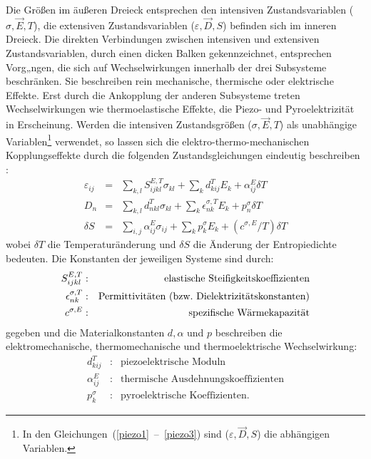 Die Größen im äußeren Dreieck entsprechen den intensiven Zustandsvariablen
($\sigma, \vec{E}, T$), die extensiven Zustandsvariablen
($\varepsilon, \vec{D}, S$) befinden sich
im inneren Dreieck. Die direkten Verbindungen zwischen
intensiven und extensiven Zustandsvariablen, durch einen dicken Balken
gekennzeichnet, entsprechen Vorg„ngen, die sich auf Wechselwirkungen
innerhalb der drei Subsysteme beschränken.  Sie beschreiben rein
mechanische, thermische
oder elektrische Effekte.  Erst durch die Ankopplung der anderen
Subsysteme treten Wechselwirkungen wie thermoelastische Effekte,
die Piezo- und Pyroelektrizität in Erscheinung.
Werden die intensiven Zustandsgrößen ($\sigma, \vec{E}, T$) als
unabhängige Variablen\footnote{In den
Gleichungen~(\ref{piezo1}~--~\ref{piezo3}) sind
($\varepsilon, \vec{D}, S$) die abhängigen Variablen.}
verwendet, so lassen sich die elektro-thermo-mechanischen
Kopplungseffekte durch die folgenden Zustandsgleichungen eindeutig
beschreiben \cite{Ike90a, Nye57}:
%
\begin{eqnarray}
\label{piezo1}
 \varepsilon_{ij} & = & \sum_{k,l} S_{ijkl}^{E,T} \sigma_{kl} +
                        \sum_{k} d_{kij}^{T} E_{k} +
                        \alpha_{ij}^{E} \delta T \\
\label{piezo2}
 D_{n}            & = & \sum_{k,l} d_{nkl}^{T} \sigma_{kl} +
                        \sum_{k} \epsilon_{nk}^{\sigma, T} E_{k} +
                        p_{n}^{\sigma} \delta T \\
\label{piezo3}
 \delta S         & = & \sum_{i,j} \alpha_{ij}^{E} \sigma_{ij} +
                        \sum_{k} p_{k}^{\sigma} E_{k} +
                        (c^{\sigma, E}/T) \delta T
\end{eqnarray}
%
wobei $\delta T$ die Temperaturänderung und $\delta S$ die
Änderung der Entropiedichte bedeuten. Die Konstanten der jeweiligen
Systeme sind durch:
\begin{eqnarray*}
 S_{ijkl}^{E,T}            & : & \mbox{elastische Steifigkeitskoeffizienten}\\
 \epsilon_{nk}^{\sigma,T}  & : & \mbox{Permittivitäten (bzw.\
                                  Dielektrizitätskonstanten)}\\
 c^{\sigma,E}              & : & \mbox{spezifische Wärmekapazität}
\end{eqnarray*}
gegeben und die Materialkonstanten $d, \alpha$ und $p$ beschreiben
die elektromechanische, thermomechanische und thermoelektrische
Wechselwirkung:
\begin{eqnarray*}
    d_{kij}^{T}     & : &   \mbox{piezoelektrische Moduln}\\
    \alpha_{ij}^{E} & : &   \mbox{thermische Ausdehnungskoeffizienten}\\
    p_{k}^{\sigma}  & : &   \mbox{pyroelektrische Koeffizienten.}
\end{eqnarray*}
